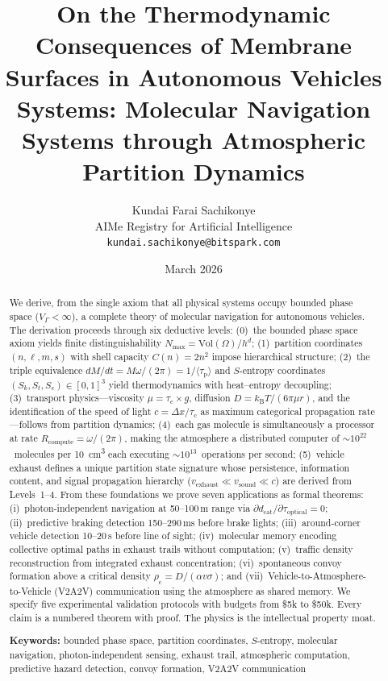 \documentclass[11pt,twocolumn,a4paper]{article}
\title{\textbf{On the Thermodynamic Consequences of Membrane Surfaces in Autonomous Vehicles Systems: Molecular Navigation Systems through Atmospheric Partition Dynamics}}
\author{
Kundai Farai Sachikonye\\[0.3em]
AIMe Registry for Artificial Intelligence\\[0.3em]
\texttt{kundai.sachikonye@bitspark.com}
}
\date{March 2026}
\theoremstyle{plain}
\theoremstyle{definition}
\theoremstyle{remark}
\newcommand{\Sk}{S_k}
\newcommand{\St}{S_t}
\newcommand{\Se}{S_e}
\newcommand{\kB}{k_{\mathrm{B}}}
\newcommand{\dcat}{d_{\mathrm{cat}}}
\newcommand{\Rcompute}{R_{\mathrm{compute}}}
\newcommand{\VGamma}{V_{\Gamma}}
\newcommand{\Nmax}{N_{\mathrm{max}}}
\newcommand{\tauc}{\tau_{\mathrm{c}}}
\newcommand{\taup}{\tau_{\mathrm{p}}}
\newcommand{\rhoc}{\rho_{\mathrm{c}}}
\begin{document}
\maketitle

\begin{abstract}
\noindent We derive, from the single axiom that all physical systems occupy bounded phase space ($\VGamma < \infty$), a complete theory of molecular navigation for autonomous vehicles. The derivation proceeds through six deductive levels: (0)~the bounded phase space axiom yields finite distinguishability $\Nmax = \mathrm{Vol}(\Omega)/h^d$; (1)~partition coordinates $(n, \ell, m, s)$ with shell capacity $C(n) = 2n^2$ impose hierarchical structure; (2)~the triple equivalence $dM/dt = M\omega/(2\pi) = 1/\langle \taup \rangle$ and $S$-entropy coordinates $(\Sk, \St, \Se) \in [0,1]^3$ yield thermodynamics with heat--entropy decoupling; (3)~transport physics---viscosity $\mu = \tauc \times g$, diffusion $D = \kB T/(6\pi\mu r)$, and the identification of the speed of light $c = \Delta x/\tauc$ as maximum categorical propagation rate---follows from partition dynamics; (4)~each gas molecule is simultaneously a processor at rate $\Rcompute = \omega/(2\pi)$, making the atmosphere a distributed computer of $\sim 10^{22}$~molecules per \SI{10}{cm^3} each executing $\sim 10^{13}$~operations per second; (5)~vehicle exhaust defines a unique partition state signature whose persistence, information content, and signal propagation hierarchy ($v_{\mathrm{exhaust}} \ll v_{\mathrm{sound}} \ll c$) are derived from Levels~1--4. From these foundations we prove seven applications as formal theorems: (i)~photon-independent navigation at 50--100\,m range via $\partial \dcat/\partial \tau_{\mathrm{optical}} = 0$; (ii)~predictive braking detection 150--290\,ms before brake lights; (iii)~around-corner vehicle detection 10--20\,s before line of sight; (iv)~molecular memory encoding collective optimal paths in exhaust trails without computation; (v)~traffic density reconstruction from integrated exhaust concentration; (vi)~spontaneous convoy formation above a critical density $\rhoc = D/(\alpha v \sigma)$; and (vii)~Vehicle-to-Atmosphere-to-Vehicle (V2A2V) communication using the atmosphere as shared memory. We specify five experimental validation protocols with budgets from \$5k to \$50k. Every claim is a numbered theorem with proof. The physics is the intellectual property moat.

\medskip
\noindent\textbf{Keywords:} bounded phase space, partition coordinates, $S$-entropy, molecular navigation, photon-independent sensing, exhaust trail, atmospheric computation, predictive hazard detection, convoy formation, V2A2V communication
\end{abstract}
\end{document}

